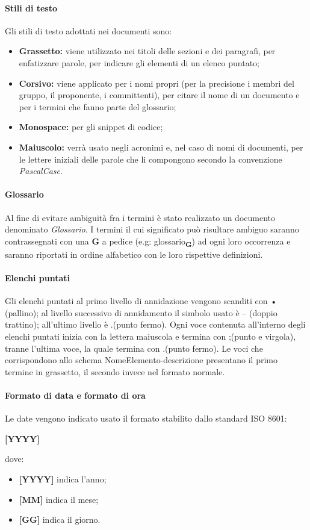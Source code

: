 \paragraph{Stili di testo}
Gli stili di testo adottati nei documenti sono: 
\begin{itemize}
	\item \textbf{Grassetto:} viene utilizzato nei titoli delle sezioni e dei paragrafi, per enfatizzare parole, per indicare gli elementi di un elenco puntato;
	\item \textbf{Corsivo:} viene applicato per i nomi propri (per la precisione i membri del gruppo, il proponente, i committenti), per citare il nome di un documento e per i termini che fanno parte del glossario;
	\item \textbf{Monospace:} per gli snippet di codice;
	\item \textbf{Maiuscolo:} verrà usato negli acronimi e, nel caso di nomi di documenti, per le lettere iniziali delle parole che li compongono secondo la convenzione \textit{PascalCase}.
\end{itemize}
\paragraph{Glossario}  
Al fine di evitare ambiguità fra i termini è stato realizzato un documento denominato \textit{Glossario}. I termini il cui significato può risultare ambiguo saranno contrassegnati con una \textbf{G} a pedice (e.g: \texorpdfstring{glossario\textsubscript{\textbf{G}}})) ad ogni loro occorrenza e  saranno riportati in ordine alfabetico con le loro rispettive definizioni.
\paragraph{Elenchi puntati}
Gli elenchi puntati al primo livello di annidazione vengono scanditi con • (pallino); al livello successivo di annidamento il simbolo usato è -- (doppio trattino); all'ultimo livello è .(punto fermo).\newline
Ogni voce contenuta all'interno degli elenchi puntati inizia con la lettera maiuscola e termina con ;(punto e virgola), tranne l'ultima voce, la quale termina con .(punto fermo).\newline
Le voci che corrispondono allo schema NomeElemento-descrizione presentano il primo termine in grassetto, il secondo invece nel formato normale. 
\paragraph{Formato di data e formato di ora}
Le date vengono indicato usato il formato stabilito dallo standard ISO 8601:\newline
\centerline{\textbf{[YYYY]\-[MM]\-[DD]}}
\newline
dove:
\begin{itemize}
	\item \textbf{[YYYY]} indica l'anno;
	\item \textbf{[MM]} indica il mese;
	\item \textbf{[GG]} indica il giorno.
\end{itemize}
